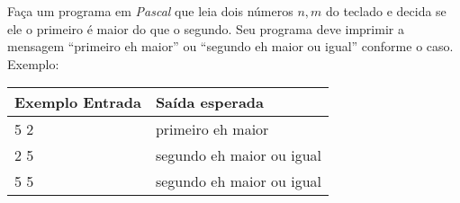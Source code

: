 
\item Faça um programa em \emph{Pascal} que leia dois números $n, m$ do teclado
e decida se ele o primeiro é maior do que o segundo. Seu programa deve imprimir
a mensagem ``primeiro eh maior'' ou ``segundo eh maior ou igual'' conforme o caso. Exemplo:

\begin{center}
\begin{tabular}{|l|l|} \hline
Exemplo Entrada & Saída esperada \\ \hline
5 2             & primeiro eh maior               \\ \hline
2 5             & segundo eh maior ou igual       \\ \hline
5 5             & segundo eh maior ou igual       \\ \hline
\end{tabular}
\end{center}